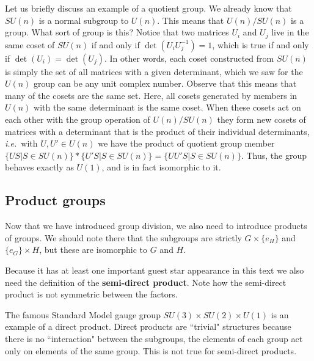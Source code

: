 \documentclass[notes.tex]{subfiles}
\begin{document}
Let us briefly discuss an example of a quotient group. We already know that $SU(n)$ is a normal subgroup to $U(n)$. This means that $U(n)/SU(n)$ is a group. What sort of group is this? Notice that two matrices $U_i$ and $U_j$ live in the same coset of $SU(n)$ if and only if $\det(U_iU_j^{-1})=1$, which is true if and only if $\det(U_i)=\det(U_j)$. In other words, each coset constructed from $SU(n)$ is simply the set of all matrices with a given determinant, which we saw for the $U(n)$ group can be any unit complex number. Observe that this means that many of the cosets are the same set. Here, all cosets generated by members in $U(n)$ with the same determinant is the same coset. 
When these cosets act on each other with the group operation of $U(n)/SU(n)$ they form new cosets of matrices with a determinant that is the product of their individual determinants, {\it i.e.}\ with $U,U'\in U(n)$ we have the product of quotient group member $\{US|S\in SU(n)\}*\{U'S| S\in SU(n)\}=\{ UU'S| S\in SU(n)\}$. Thus, the group behaves exactly as $U(1)$, and is in fact isomorphic to it.

\subsection{Product groups}
Now that we have introduced group division,  we also need to introduce products of groups. 
We should note there that the subgroups are strictly $G\times\{e_H\}$ and $\{e_G\}\times H$, but these are isomorphic to $G$ and $H$.

Because it has at least one important guest star appearance in this text we also need the definition of the {\bf semi-direct product}.
Note how the semi-direct product is not symmetric between the factors.

The famous Standard Model gauge group $SU(3) \times SU(2)\times U(1)$ is an example of a direct product. Direct products are ``trivial" structures because there is no ``interaction" between the subgroups, the elements of each group act only on elements of the same group. This is not true for semi-direct products. 
\end{document}

